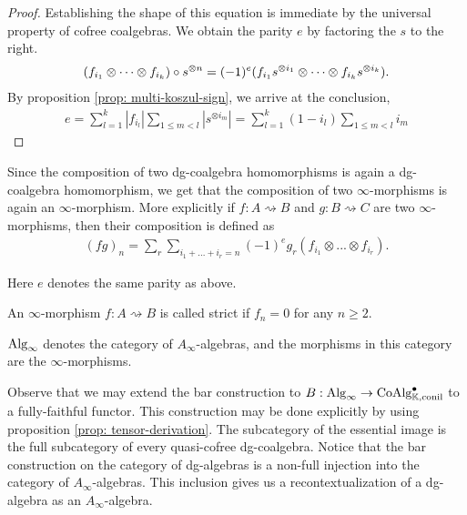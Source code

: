 \documentclass[../thesis.tex]{subfiles}
\begin{document}
        \begin{proof}
            Establishing the shape of this equation is immediate by the universal property of cofree coalgebras. We obtain the parity $e$ by factoring the $s$ to the right.
            \begin{align*}
                (f_{i_1} \otimes \cdots \otimes f_{i_k}) \circ s^{\otimes n} = (-1)^e(f_{i_1}s^{\otimes i_1} \otimes \cdots \otimes f_{i_k}s^{\otimes i_k})\tt{.}
            \end{align*}
            By proposition \ref{prop: multi-koszul-sign}, we arrive at the conclusion,
            \begin{align*}
                e = \sum_{l = 1}^k|f_{i_l}|\sum_{1\leq m < l}|s^{\otimes i_m}|= \sum_{l = 1}^k(1- i_l)\sum_{1 \leq m < l}i_m
            \end{align*}
        \end{proof}

        Since the composition of two dg-coalgebra homomorphisms is again a dg-coalgebra homomorphism, we get that the composition of two $\infty$-morphisms is again an $\infty$-morphism. More explicitly if $f:A\rightsquigarrow B$ and $g: B\rightsquigarrow C$ are two $\infty$-morphisms, then their composition is defined as
        \begin{align*}
            (fg)_n = \sum_r\sum_{i_1 + ... + i_r = n} (-1)^eg_r(f_{i_1}\otimes ... \otimes f_{i_r})\text{.}
        \end{align*}

        Here $e$ denotes the same parity as above.

        \begin{definition}
            An $\infty$-morphism $f: A\rightsquigarrow B$ is called strict if $f_n = 0$ for any $n\geq 2$. 
        \end{definition}

        \begin{definition}
            $\tt{Alg}_\infty$ denotes the category of $A_\infty$-algebras, and the morphisms in this category are the $\infty$-morphisms.
        \end{definition}

        Observe that we may extend the bar construction to $B: \tt{Alg}_\infty \rightarrow \tt{Co\tt{Alg}}_{\mathbb{K},\tt{conil}}^\bullet$ to a fully-faithful functor. This construction may be done explicitly by using proposition \ref{prop: tensor-derivation}. The subcategory of the essential image is the full subcategory of every quasi-cofree dg-coalgebra. Notice that the bar construction on the category of dg-algebras is a non-full injection into the category of $A_\infty$-algebras. This inclusion gives us a recontextualization of a dg-algebra as an $A_\infty$-algebra.
\end{document}
